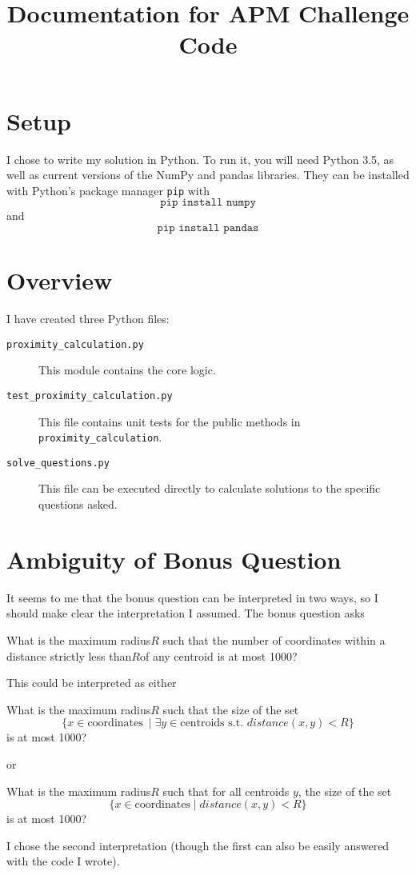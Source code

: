 \documentclass{amsart}
\theoremstyle{definition}
\theoremstyle{definition}
\begin{document}
\title[Documentation for APM Challenge Code]{Documentation for APM Challenge Code}

\date{}

\maketitle

\section{Setup}
I chose to write my solution in Python.  To run it, you will need Python 3.5, as well as current versions of the NumPy and pandas libraries.  They can be installed with Python's package manager \texttt{pip} with
\[
\texttt{pip install numpy}
\]
and
\[
\texttt{pip install pandas}
\]

\section{Overview}
I have created three Python files:
\begin{description}
\item[\texttt{proximity\_calculation.py}] This module contains the core logic.
\item[\texttt{test\_proximity\_calculation.py}] This file contains unit tests for the public methods in \texttt{proximity\_calculation}.
\item[\texttt{solve\_questions.py}] This file can be executed directly to calculate solutions to the specific questions asked.
\end{description}

\section{Ambiguity of Bonus Question}
It seems to me that the bonus question can be interpreted in two ways, so I should make clear the interpretation I assumed.  The bonus question asks
\begin{displayquote}
  What is the maximum radius ​$R$ such that the number of coordinates within a distance strictly less than ​$R$ ​of any centroid is at most 1000?
\end{displayquote}
This could be interpreted as either
\begin{displayquote}
  What is the maximum radius ​$R$ such that the size of the set
  \[
  \{x \in \mbox{coordinates}\ \mid \exists y \in \mbox{centroids s.t. } distance(x, y) < R\}
  \]
  is at most 1000?
\end{displayquote}
or
\begin{displayquote}
  What is the maximum radius ​$R$ such that for all centroids $y$, the size of the set
  \[
  \{x \in \mbox{coordinates} \mid distance(x, y) < R\}
  \]
  is at most 1000?
\end{displayquote}
I chose the second interpretation (though the first can also be easily answered with the code I wrote).
\end{document}
